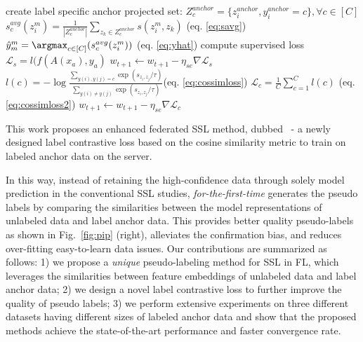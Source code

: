 \documentclass[withindex,glossary,firstyr]{cam-thesis}
\begin{document}
\begin{algorithm}[!t]
\begin{algorithmic}
        \EndFor
    \EndProcedure{}
        \State create label specific anchor projected set: $Z^{anchor}_{c} = \{ z^{anchor}_{i}, y^{anchor}_i = c \}, \forall c \in [C] $
        \State $s^{avg}_c(z^m_{i}) = \frac{1}{|Z^{anchor}_{c}|} \sum_{z_k \in Z^{anchor}_{c}} s(z^m_{i}, z_k)$  (eq. \ref{eq:savg})
        \State $\hat{y}^m_{m} = \argmax_{c \in [C]} ( s^{avg}_c(z^m_{i}))$  (eq. \ref{eq:yhat})
    \EndProcedure
        \State compute supervised loss $\mathcal{L}_s = l(f(A(x_a), y_a)$
        \State $w_{t+1} \leftarrow w_{t+1} - \eta_{se}\nabla \mathcal{L}_s$
        \State $l(c) = -\log \frac{\sum _{y(i), y(j) = c}\exp (s_{z_i,z_j}/\tau)}{\sum_{y(i) \not = y(j) } \exp(s_{z_i,z_j}/\tau)}  $(eq. \ref{eq:cossimloss})
        \State $\mathcal{L}_c =  \frac{1}{C} \sum_{c=1}^C l(c) $ (eq. \ref{eq:cossimloss2})
        \State $w_{t+1} \leftarrow w_{t+1} - \eta_{se}\nabla \mathcal{L}_c$
    \EndProcedure
    \end{algorithmic}
\end{algorithm}

This work proposes an enhanced federated SSL method, dubbed \method ~- a newly designed label contrastive loss based on the cosine similarity metric to train on labeled anchor data on the server.

In this way, instead of retaining the high-confidence data through solely model prediction in the conventional SSL studies, \method \textit{for-the-first-time} generates the pseudo labels by comparing the similarities between the model representations of unlabeled data and label anchor data. This provides better quality pseudo-labels as shown in Fig.~\ref{fig:pip} (right), alleviates the confirmation bias, and reduces over-fitting easy-to-learn data issues. Our contributions are summarized as follows: 1) we propose a \textit{unique} pseudo-labeling method \method for SSL in FL, which leverages the similarities between feature embeddings of unlabeled data and label anchor data; 2) we design a novel label contrastive loss to further improve the quality of pseudo labels; 3) we perform extensive experiments on three different datasets having different sizes of labeled anchor data and show that the proposed methods achieve the state-of-the-art performance and faster convergence rate.
\end{document}
